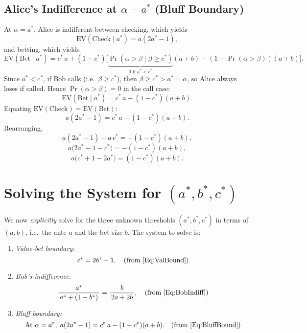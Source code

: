 \documentclass{article}
\begin{document}
\subsection{Alice's Indifference at $\alpha = a^*$ (Bluff Boundary)}

At $\alpha = a^*$, Alice is indifferent between checking, which yields
\[
\text{EV}(\text{Check}\mid a^*) = a(2a^*-1),
\]
and betting, which yields
\[
\text{EV}(\text{Bet}\mid a^*) 
= c^*\,a + (1-c^*)\bigl[\underbrace{\Pr(\alpha>\beta \mid \beta\ge c^*)}_{0\text{ if }a^*<c^*}(a+b) - (1-\Pr(\alpha>\beta))(a+b)\bigr].
\]
Since $a^*<c^*$, if Bob calls (i.e.\ $\beta\ge c^*$), then $\beta \ge c^* > a^* = \alpha$, so Alice always loses if called.  Hence $\Pr(\alpha>\beta)=0$ in the call case:
\[
\text{EV}(\text{Bet}\mid a^*) = c^*\,a - (1-c^*)(a+b).
\]
Equating $\text{EV}(\text{Check}) = \text{EV}(\text{Bet})$:
\[
a(2a^* -1) = c^*\,a - (1-c^*)(a+b).
\]
Rearranging,
\[
a(2a^* -1) - a\,c^* = -(1-c^*)(a+b),
\]
\[
a\bigl(2a^* -1 - c^*\bigr) = -(1-c^*)(a+b),
\]
\begin{equation}
    a\bigl(c^* +1 -2a^*\bigr) = (1-c^*)(a+b). \label{Eq:BluffBound}
\end{equation}


\section{Solving the System for \texorpdfstring{$(a^*,b^*,c^*)$}{(a*, b*, c*)}}
\label{sec:SolvingThresholds}

We now \emph{explicitly} solve for the three unknown thresholds $(a^*, b^*, c^*)$ in terms of $(a,b)$, i.e.\ the ante $a$ and the bet size $b$.  The system to solve is:

\begin{enumerate}
\item \emph{Value-bet boundary:} 
\[
c^* = 2b^* -1,
\quad
\text{(from \eqref{Eq:ValBound})}
\]

\item \emph{Bob's indifference:}
\[
\frac{a^*}{\,a^* + (1-b^*)\,} = \frac{b}{\,2a + 2b\,},
\quad
\text{(from \eqref{Eq:BobIndiff})}
\]

\item \emph{Bluff boundary:} 
\[
\text{At } \alpha=a^*,\; a(2a^*-1) = c^*\,a - (1-c^*)(a+b).
\quad
\text{(from \eqref{Eq:BluffBound})}
\]
\end{enumerate}
\end{document}
